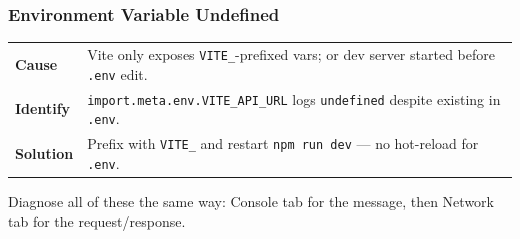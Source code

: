 \subsubsection*{Environment Variable Undefined}
\noindent\begin{tabularx}{\textwidth}{@{}>{\bfseries}p{2.3cm}X@{}}
\toprule
Cause & Vite only exposes \texttt{VITE\_}-prefixed vars; or dev server started before \texttt{.env} edit. \\
Identify & \texttt{import.meta.env.VITE\_API\_URL} logs \texttt{undefined} despite existing in \texttt{.env}. \\
Solution & Prefix with \texttt{VITE\_} and restart \texttt{npm run dev} --- no hot-reload for \texttt{.env}. \\
\bottomrule
\end{tabularx}

\begin{tipbox}[TIP]
Diagnose all of these the same way: Console tab for the message, then Network tab for the request/response.
\end{tipbox}
